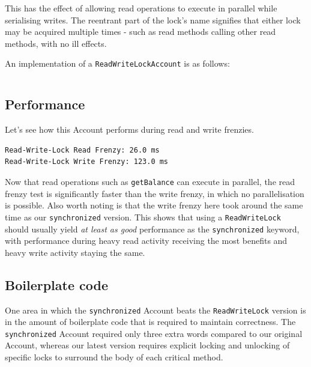 \documentclass[a4paper,12pt]{kth-mag}
\begin{document}
This has the effect of allowing read operations to execute in parallel while serialising writes. The reentrant part of the lock's name signifies that either lock may be acquired multiple times - such as read methods calling other read methods, with no ill effects.

An implementation of a \texttt{ReadWriteLockAccount} is as follows:

 \begin{listing}[H]
    \inputminted[firstline=4,linenos=true,bgcolor=code]{java}{../java_accounts/ReadWriteLockAccount.java}
\end{listing}

\subsection{Performance}

Let's see how this Account performs during read and write frenzies.

\begin{listing}[H]
	\begin{verbatim}
Read-Write-Lock Read Frenzy: 26.0 ms
Read-Write-Lock Write Frenzy: 123.0 ms
	\end{verbatim}
\end{listing}

Now that read operations such as \texttt{getBalance} can execute in parallel, the read frenzy test is significantly faster than the write frenzy, in which no parallelisation is possible. Also worth noting is that the write frenzy here took around the same time as our \texttt{synchronized} version. This shows that using a \texttt{ReadWriteLock} should usually yield \textit{at least as good} performance as the \texttt{synchronized} keyword, with performance during heavy read activity receiving the most benefits and heavy write activity staying the same.

\subsection{Boilerplate code}

One area in which the \texttt{synchronized} Account beats the \texttt{ReadWriteLock} version is in the amount of boilerplate code that is required to maintain correctness. The \texttt{synchronized} Account required only three extra words compared to our original Account, whereas our latest version requires explicit locking and unlocking of specific locks to surround the body of each critical method. 
\end{document}
